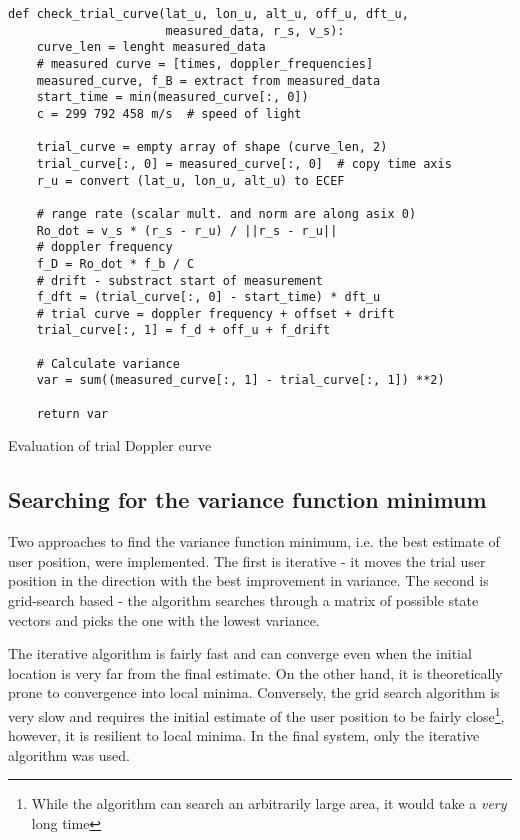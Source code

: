\begin{algorithm}
    \centering
    \begin{verbatim}
def check_trial_curve(lat_u, lon_u, alt_u, off_u, dft_u, 
                      measured_data, r_s, v_s):                      
    curve_len = lenght measured_data
    # measured curve = [times, doppler_frequencies]
    measured_curve, f_B = extract from measured_data
    start_time = min(measured_curve[:, 0])
    c = 299 792 458 m/s  # speed of light
    
    trial_curve = empty array of shape (curve_len, 2)
    trial_curve[:, 0] = measured_curve[:, 0]  # copy time axis
    r_u = convert (lat_u, lon_u, alt_u) to ECEF

    # range rate (scalar mult. and norm are along asix 0)
    Ro_dot = v_s * (r_s - r_u) / ||r_s - r_u|| 
    # doppler frequency 
    f_D = Ro_dot * f_b / C  
    # drift - substract start of measurement
    f_dft = (trial_curve[:, 0] - start_time) * dft_u
    # trial curve = doppler frequency + offset + drift
    trial_curve[:, 1] = f_d + off_u + f_drift

    # Calculate variance
    var = sum((measured_curve[:, 1] - trial_curve[:, 1]) **2)
    
    return var
    \end{verbatim}
    \caption{Evaluation of trial Doppler curve}
    \label{a_des_check_trial_curve}
\end{algorithm}


\subsection{Searching for the variance function minimum}
Two approaches to find the variance function minimum, i.e. the best estimate of user position, were implemented. The first is iterative - it moves the trial user position in the direction with the best improvement in variance. The second is grid-search based - the algorithm searches through a matrix of possible state vectors and picks the one with the lowest variance.

The iterative algorithm is fairly fast and can converge even when the initial location is very far from the final estimate. On the other hand, it is theoretically prone to convergence into local minima. Conversely, the grid search algorithm is very slow and requires the initial estimate of the user position to be fairly close\footnote{While the algorithm can search an arbitrarily large area, it would take a \textit{very} long time}, however, it is resilient to local minima. In the final system, only the iterative algorithm was used.


